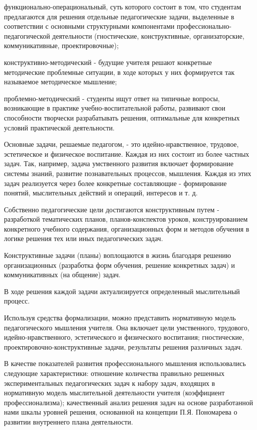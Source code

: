 \documentclass[a4paper, 12pt]{extarticle}
\begin{document}
функционально-операциональный, суть которого состоит в том, что студентам предлагаются для решения отдельные педагогические задачи, выделенные в соответствии с основными структурными компонентами профессионально-педагогической деятельности (гностические, конструктивные, организаторские, коммуникативные, проектировочные); 

конструктивно-методический - будущие учителя решают конкретные методические проблемные ситуации, в ходе которых у них формируется так называемое методическое мышление;

проблемно-методический - студенты ищут ответ на типичные вопросы, возникающие в практике учебно-воспитательной работы, развивают свои способности творчески разрабатывать решения, оптимальные для конкретных условий практической деятельности. 

Основные задачи, решаемые педагогом, - это идейно-нравственное, трудовое, эстетическое и физическое воспитание. Каждая из них состоит из более частных задач. Так, например, задача умственного развития включает формирование системы знаний, развитие познавательных процессов, мышления. Каждая из этих задач реализуется через более конкретные составляющие - формирование понятий, мыслительных действий и операций, интересов и т. д.

Собственно педагогические цели достигаются конструктивным путем - разработкой тематических планов, планов-конспектов уроков, конструированием конкретного учебного содержания, организационных форм и методов обучения в логике решения тех или иных педагогических задач.

Конструктивные задачи (планы) воплощаются в жизнь благодаря решению организационных (разработка форм обучения, решение конкретных задач) и коммуникативных (на общение) задач.

В ходе решения каждой задачи актуализируется определенный мыслительный процесс.

Используя средства формализации, можно представить нормативную модель педагогического мышления учителя. Она включает цели умственного, трудового, идейно-нравственного, эстетического и физического воспитания; гностические, проектировочно-конструктивные задачи, результаты решения различных задач.

В качестве показателей развития профессионального мышления использовались следующие характеристики: отношение количества правильно решенных экспериментальных педагогических задач к набору задач, входящих в нормативную модель мыслительной деятельности учителя (коэффициент профессионализма); качественный анализ решения задач на основе разработанной нами шкалы уровней решения, основанной на концепции П.Я. Пономарева о развитии внутреннего плана деятельности.
\end{document}
